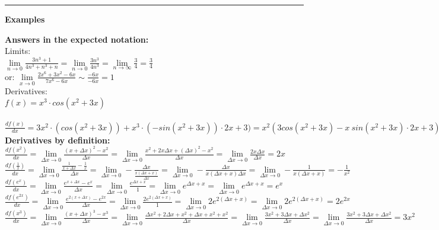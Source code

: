 \documentclass[12pt,a4paper]{report}
\begin{document}
	\rule{17cm}{1pt}
	
	\begin{center}\textbf{Examples}\end{center}
	
	\textbf{Answers in the expected notation:}\\
	Limits:\\
	$\lim\limits_{n \to 0} \frac{3n^3 + 1}{4n^3+n^3+n} = \lim\limits_{n \to 0} \frac{3n^3}{4n^3} = \lim\limits_{n \to \infty} \frac{3}{4} = \frac{3}{4}$\\
	or: $\lim\limits_{x \to 0} \frac{2x^6 + 3x^2 - 6x}{7x^6 - 6x} \sim \frac{-6x}{-6x} = 1$\\
	
	Derivatives:\\
	$f(x) = x^3 \cdot cos (x^2 + 3x)$\\\
	$\frac{df(x)}{dx} = 3x^2 \cdot (cos(x^2 + 3x)) + x^3 \cdot (-sin (x^2 + 3x)) \cdot 2x+3) = x^2 (3 cos(x^2+3x) - x \ sin(x^2 + 3x) \cdot 2x + 3)$\\
	
	\textbf{Derivatives by definition:}\\
	$\frac{df(x^2)}{dx} = \lim\limits_{\Delta x \to 0}\frac{(x+\Delta x)^2 - x^2}{\Delta x} = \lim\limits_{\Delta x \to 0}\frac{x^2 + 2x \Delta x+ (\Delta x)^2-x^2}{\Delta x} = \lim\limits_{\Delta x \to 0}\frac{2x \Delta x}{ \Delta x} = 2x$\\
	$\frac{df(\frac{1}{x})}{dx} = \lim\limits_{\Delta x \to 0} \frac{\frac{1}{x + \Delta x} - \frac{1}{x}}{\Delta x} = \lim\limits_{\Delta x \to 0} -\frac{\Delta x}{\frac{x (\Delta x + x)}{\Delta x}} = \lim\limits_{\Delta x \to 0} -\frac{\Delta x}{x (\Delta x + x) \Delta x} = \lim\limits_{\Delta x \to 0} -\frac{1}{x (\Delta x + x)} = -\frac{1}{x^2}$\\
	$\frac{df(e^x)}{dx} = \lim\limits_{\Delta x \to 0} \frac{e^{x+\Delta x} - e^x}{\Delta x} = \lim\limits_{\Delta x \to 0} \frac{e^{\Delta x + x}}{1} = \lim\limits_{\Delta x \to 0} e^{\Delta x + x} = \lim\limits_{\Delta x \to 0} e^{\Delta x + x} = e^x$\\
	$\frac{df(e^{2x})}{dx} = \lim\limits_{\Delta x \to 0} \frac{e^{2(x+\Delta x)} - e^{2x}}{\Delta x} = \lim\limits_{\Delta x \to 0} \frac{2e^{2(\Delta x + x)}}{1} = \lim\limits_{\Delta x \to 0} 2e^{2(\Delta x + x)} = \lim\limits_{\Delta x \to 0} 2e^{2(\Delta x + x)} = 2e^{2x}$\\
	$\frac{df(x^3)}{dx} = \lim\limits_{\Delta x \to 0} \frac{(x+\Delta x)^3 - x^3}{\Delta x} = \lim\limits_{\Delta x \to 0} \frac{\Delta x^2 + 2\Delta x + x^2 + \Delta x + x^2 + x^2}{\Delta x} = \lim\limits_{\Delta x \to 0} \frac{3x^2 + 3\Delta x + \Delta x^2}{\Delta x} = \lim\limits_{\Delta x \to 0} \frac{3x^2 + 3\Delta x + \Delta x^2}{\Delta x} = 3x^2$\\
	
\end{document}
